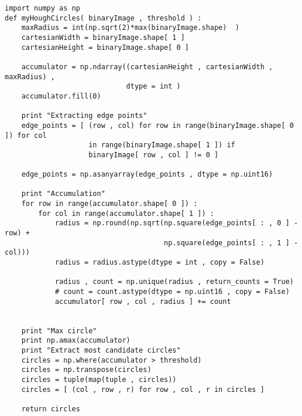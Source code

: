 \begin{lstlisting}[caption=Python implementation for Hough Circles Detection , label=imp:hough-circles]
import numpy as np
def myHoughCircles( binaryImage , threshold ) :
    maxRadius = int(np.sqrt(2)*max(binaryImage.shape)  )
    cartesianWidth = binaryImage.shape[ 1 ]
    cartesianHeight = binaryImage.shape[ 0 ]

    accumulator = np.ndarray((cartesianHeight , cartesianWidth , maxRadius) ,
                             dtype = int )
    accumulator.fill(0)

    print "Extracting edge points"
    edge_points = [ (row , col) for row in range(binaryImage.shape[ 0 ]) for col
                    in range(binaryImage.shape[ 1 ]) if
                    binaryImage[ row , col ] != 0 ]

    edge_points = np.asanyarray(edge_points , dtype = np.uint16)

    print "Accumulation"
    for row in range(accumulator.shape[ 0 ]) :
        for col in range(accumulator.shape[ 1 ]) :
            radius = np.round(np.sqrt(np.square(edge_points[ : , 0 ] - row) +
                                      np.square(edge_points[ : , 1 ] - col)))
            radius = radius.astype(dtype = int , copy = False)

            radius , count = np.unique(radius , return_counts = True)
            # count = count.astype(dtype = np.uint16 , copy = False)
            accumulator[ row , col , radius ] += count


    print "Max circle"
    print np.amax(accumulator)
    print "Extract most candidate circles"
    circles = np.where(accumulator > threshold)
    circles = np.transpose(circles)
    circles = tuple(map(tuple , circles))
    circles = [ (col , row , r) for row , col , r in circles ]

    return circles
\end{lstlisting}
